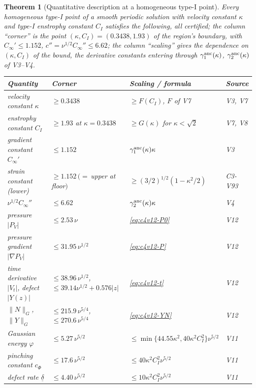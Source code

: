 \documentclass[11pt]{article}
\theoremstyle{plain}
\newtheorem{theorem}{Theorem}[section]
\theoremstyle{definition}
\theoremstyle{remark}
\begin{document}
\begin{theorem}[Quantitative description at a homogeneous type-I point]
\label{thm:c4v14-table}
Every homogeneous type-I point of a smooth periodic solution with
velocity constant \(\kappa\) and type-I enstrophy constant \(C_I\) satisfies
the following, all certified; the column ``corner'' is the point
\((\kappa,C_I)=(0.3438,1.93)\) of the region's boundary, with \(C_\infty'\le1.152\),
\(c''=\nu^{1/2}C_\infty''\le6.62\); the column ``scaling'' gives the dependence on
\((\kappa,C_I)\) of the bound, the derivative constants entering through
\(\gamma_1^{\rm anc}(\kappa)\), \(\gamma_2^{\rm anc}(\kappa)\) of V3--V4.

\medskip
\begin{center}\small
\begin{tabular}{@{}p{}p{}p{}p{}@{}}
\toprule
\textbf{Quantity} & \textbf{Corner} & \textbf{Scaling / formula} & \textbf{Source}\\
\midrule
velocity constant \(\kappa\) & \(\ge0.3438\) & \(\ge F(C_I)\), \(F\) of V7 & V3, V7\\
enstrophy constant \(C_I\) & \(\ge1.93\) at \(\kappa=0.3438\) & \(\ge G(\kappa)\) for \(\kappa<\sqrt2\) & V7, V8\\
gradient constant \(C_\infty'\) & \(\le1.152\) & \(\gamma_1^{\rm anc}(\kappa)\kappa\) & V3\\
strain constant (lower) & \(\ge1.152\)\,\((=\)\,upper at floor\()\) & \(\ge(3/2)^{1/2}(1-\kappa^2/2)\) & C3-V93\\
\(\nu^{1/2}C_\infty''\) & \(\le6.62\) & \(\gamma_2^{\rm anc}(\kappa)\kappa\) & V4\\
pressure \(|P_V|\) & \(\le2.53\,\nu\) & \eqref{eq:c4v12-P0} & V12\\
pressure gradient \(|\nabla P_V|\) & \(\le31.95\,\nu^{1/2}\) & \eqref{eq:c4v12-P} & V12\\
time derivative \(|V_t|\), defect \(|Y(z)|\) & \(\le38.96\,\nu^{1/2}\), \(\le39.14\nu^{1/2}+0.576|z|\) & \eqref{eq:c4v12-t} & V12\\
\(\|N\|_G\), \(\|Y\|_G\) & \(\le215.9\,\nu^{5/4}\), \(\le270.6\,\nu^{5/4}\) & \eqref{eq:c4v12-YN} & V12\\
Gaussian energy \(\varphi\) & \(\le5.27\,\nu^{5/2}\) & \(\le\min\{44.55\kappa^2,40\kappa^2C_I^2\}\nu^{5/2}\) & V11\\
pinching constant \(c_\Phi\) & \(\le17.6\,\nu^{5/2}\) & \(\le40\kappa^2C_I^2\nu^{5/2}\) & V11\\
defect rate \(\underline\delta\) & \(\le4.40\,\nu^{5/2}\) & \(\le10\kappa^2C_I^2\nu^{5/2}\) & V11\\

\end{tabular}
\end{center}
\end{theorem}
\end{document}
